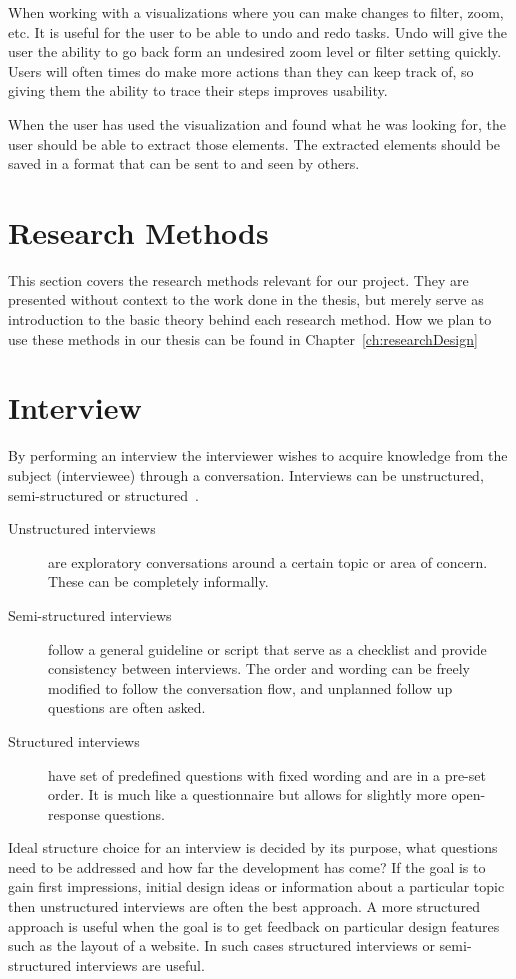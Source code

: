 When working with a visualizations where you can make changes to filter, zoom, etc. It is useful for the user to be able to undo and redo tasks. Undo will give the user the ability to go back form an undesired zoom level or filter setting quickly. Users will often times do make more actions than they can keep track of, so giving them the ability to trace their steps improves usability.

When the user has used the visualization and found what he was looking for, the user should be able to extract those elements. The extracted elements should be saved in a format that can be sent to and seen by others. 

\section{Research Methods}
This section covers the research methods relevant for our project. They are presented without context to the work done in the thesis, but merely serve as introduction to the basic theory behind each research method. How we plan to use these methods in our thesis can be found in Chapter~\ref{ch:researchDesign}

\section{Interview}
By performing an interview the interviewer wishes to acquire knowledge from the subject (interviewee) through a conversation. Interviews can be unstructured, semi-structured or structured~\cite{interactionDesign}.
\begin{description}
  \item[Unstructured interviews] are exploratory conversations around a certain topic or area of concern. These can be completely informally.
  \item[Semi-structured interviews] follow a general guideline or script that serve as a checklist and provide consistency between interviews. The order and wording can be freely modified to follow the conversation flow, and unplanned follow up questions are often asked.
  \item[Structured interviews] have set of predefined questions with fixed wording and are in a pre-set order. It is much like a questionnaire but allows for slightly more open-response questions.
\end{description}
Ideal structure choice for an interview is decided by its purpose, what questions need to be addressed and how far the development has come? If the goal is to gain first impressions, initial design ideas or information about a particular topic then unstructured interviews are often the best approach. A more structured approach is useful when the goal is to get feedback on particular design features such as the layout of a website. In such cases  structured interviews or semi-structured interviews are useful.

